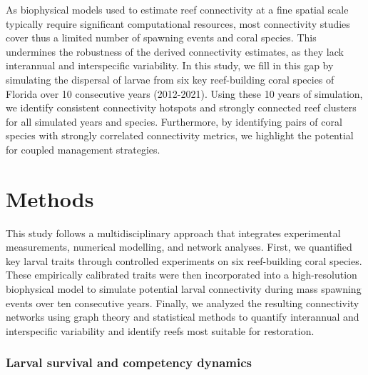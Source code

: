 \documentclass[preprint,12pt,authoryear]{elsarticle}
\begin{document}
	As biophysical models used to estimate reef connectivity at a fine spatial scale typically require significant computational resources, most connectivity studies cover thus a limited number of spawning events and coral species. This undermines the robustness of the derived connectivity estimates, as they lack interannual and interspecific variability. In this study, we fill in this gap by simulating the dispersal of larvae from six key reef-building coral species of Florida over 10 consecutive years (2012-2021). Using these 10 years of simulation, we identify consistent connectivity hotspots and strongly connected reef clusters for all simulated years and species. Furthermore, by identifying pairs of coral species with strongly correlated connectivity metrics, we highlight the potential for coupled management strategies.
	
	
	\section*{Methods}
	
	This study follows a multidisciplinary approach that integrates experimental measurements, numerical modelling, and network analyses. First, we quantified key larval traits through controlled experiments on six reef-building coral species. These empirically calibrated traits were then incorporated into a high-resolution biophysical model to simulate potential larval connectivity during mass spawning events over ten consecutive years. Finally, we analyzed the resulting connectivity networks using graph theory and statistical methods to quantify interannual and interspecific variability and identify reefs most suitable for restoration.
	
	\subsubsection*{Larval survival and competency dynamics}
	
\end{document}
